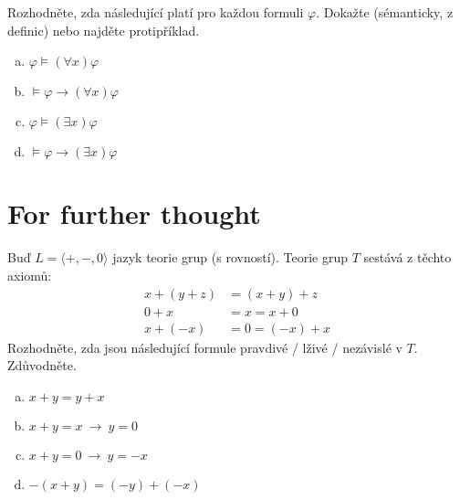 \begin{problem}
    
    Rozhodněte, zda následující platí pro každou formuli $\varphi$. Dokažte (sémanticky, z definic) nebo najděte protipříklad.
    \begin{enumerate}[(a)]
       \item $\varphi \models (\forall x)\varphi$
       \item $\models \varphi \to (\forall x)\varphi$
       \item $\varphi \models (\exists x)\varphi$
       \item $\models \varphi \to (\exists x)\varphi$
    \end{enumerate}

\end{problem}


\section*{For further thought}


\begin{problem}

    Buď $L=\langle +, -, 0\rangle$ jazyk teorie grup (s rovností). Teorie grup $T$ sestává z těchto axiomů:
    \begin{align*}
    x+(y+z)&=(x+y)+z\\
    0+x&=x=x+0\\
    x+(-x)&=0=(-x)+x
    \end{align*}
    Rozhodněte, zda jsou následující formule pravdivé / lživé / nezávislé v $T$. Zdůvodněte.
    \begin{enumerate}[(a)]
        \item $x+y=y+x$
        \item $x+y=x\ \rightarrow\ y=0$
        \item $x+y=0\ \rightarrow\ y=-x$
        \item $-(x+y)=(-y)+(-x)$
    \end{enumerate}

\end{problem}




